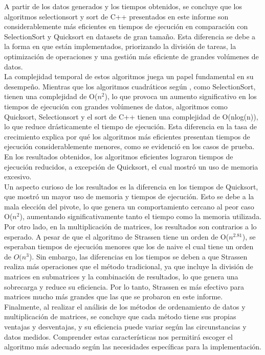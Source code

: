 A partir de los datos generados y los tiempos obtenidos, se concluye que los algoritmos selectionsort y sort de C++ presentados en este informe son considerablemente más eficientes en tiempos de ejecución en comparación con SelectionSort y Quicksort en datasets de gran tamaño. Esta diferencia se debe a la forma en que están implementados, priorizando la división de tareas, la optimización de operaciones y una gestión más eficiente de grandes volúmenes de datos.\\
La complejidad temporal de estos algoritmos juega un papel fundamental en su desempeño. Mientras que los algoritmos cuadráticos según \autocite{cormen2009}, como SelectionSort, tienen una complejidad de O($n^2$), lo que provoca un aumento significativo en los tiempos de ejecución con grandes volúmenes de datos, algoritmos como Quicksort, Selectionsort y el sort de C++ tienen una complejidad de O(nlog(n)), lo que reduce drásticamente el tiempo de ejecución. Esta diferencia en la tasa de crecimiento explica por qué los algoritmos más eficientes presentan tiempos de ejecución considerablemente menores, como se evidenció en los casos de prueba. En los resultados obtenidos, los algoritmos eficientes lograron tiempos de ejecución reducidos, a excepción de Quicksort, el cual mostró un uso de memoria excesivo.\\
Un aspecto curioso de los resultados es la diferencia en los tiempos de Quicksort, que mostró un mayor uso de memoria y tiempos de ejecución. Esto se debe a la mala elección del pivote, lo que genera un comportamiento cercano al peor caso O($n^2$), aumentando significativamente tanto el tiempo como la memoria utilizada.\\
Por otro lado, en la multiplicación de matrices, los resultados son contrarios a lo esperado. A pesar de que el algoritmo de Strassen tiene un orden de O($n^{2.81}$), se esperaban tiempos de ejecución menores que los de naive el cual tiene un orden de $O(n^3$). Sin embargo, las diferencias en los tiempos se deben a que Strassen realiza más operaciones que el método tradicional, ya que incluye la división de matrices en submatrices y la combinación de resultados, lo que genera una sobrecarga y reduce su eficiencia. Por lo tanto, Strassen es más efectivo para matrices mucho más grandes que las que se probaron en este informe.\\
Finalmente, al realizar el análisis de los métodos de ordenamiento de datos y multiplicación de matrices, se concluye que cada método tiene sus propias ventajas y desventajas, y su eficiencia puede variar según las circunstancias y datos medidos. Comprender estas características nos permitirá escoger el algoritmo más adecuado según las necesidades específicas para la implementación.